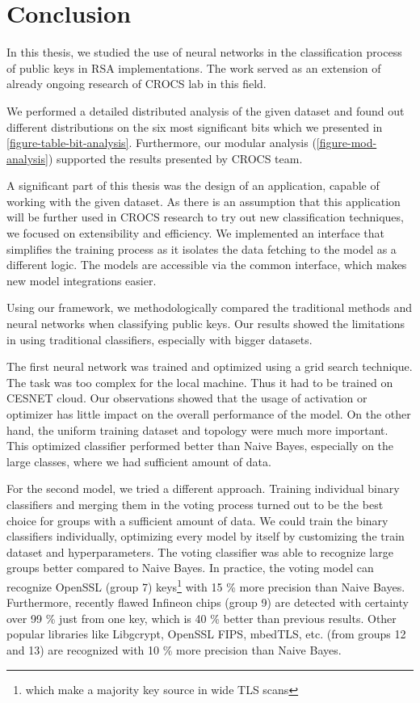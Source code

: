 \chapter{Conclusion}

In this thesis, we studied the use of neural networks in the classification process of public keys in RSA implementations. The work served as an extension of already ongoing research of CROCS lab in this field. 

We performed a detailed distributed analysis of the given dataset and found out different distributions on the six most significant bits which we presented in \autoref{figure-table-bit-analysis}. Furthermore, our modular analysis (\autoref{figure-mod-analysis}) supported the results presented by CROCS team.

A significant part of this thesis was the design of an application, capable of working with the given dataset. As there is an assumption that this application will be further used in CROCS research to try out new classification techniques, we focused on extensibility and efficiency. We implemented an interface that simplifies the training process as it isolates the data fetching to the model as a different logic. The models are accessible via the common interface, which makes new model integrations easier.

Using our framework, we methodologically compared the traditional methods and neural networks when classifying public keys. Our results showed the limitations in using traditional classifiers, especially with bigger datasets.

The first neural network was trained and optimized using a grid search technique. The task was too complex for the local machine. Thus it had to be trained on CESNET cloud. Our observations showed that the usage of activation or optimizer has little impact on the overall performance of the model. On the other hand, the uniform training dataset and topology were much more important. This optimized classifier performed better than Naive Bayes, especially on the large classes, where we had sufficient amount of data.

For the second model, we tried a different approach. Training individual binary classifiers and merging them in the voting process
turned out to be the best choice for groups with a sufficient amount of data. We could train the binary classifiers individually, optimizing every model by itself by customizing the train dataset and hyperparameters. The voting classifier was able to recognize large groups better compared to Naive Bayes. In practice, the voting model can recognize OpenSSL (group 7) keys\footnote{which make a majority key source in wide TLS scans} with 15 \% more precision than Naive Bayes. Furthermore, recently flawed Infineon chips (group 9) are detected with certainty over 99 \% just from one key, which is 40 \% better than previous results. Other popular libraries like Libgcrypt, OpenSSL FIPS, mbedTLS, etc. (from groups 12 and 13) are recognized with 10 \% more precision than Naive Bayes. 

